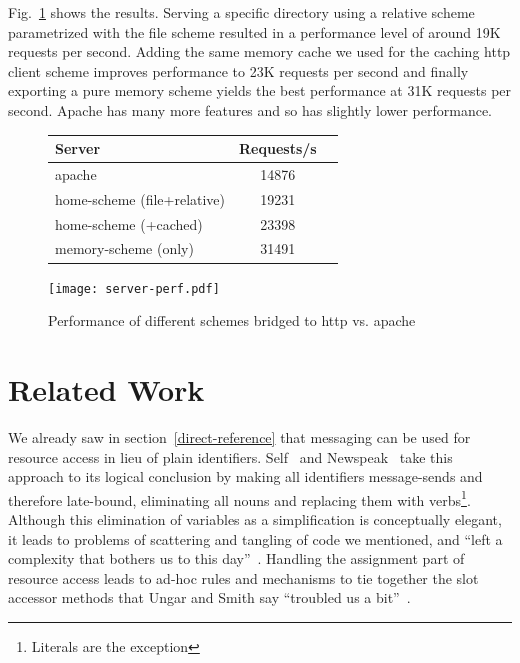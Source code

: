 \documentclass[preprint]{sigplanconf}
\begin{document}
Fig.~\ref{http-server-speed} shows the results.  Serving a specific directory using a relative scheme parametrized
with the file scheme resulted in a performance level of around 19K requests per second.  Adding the same memory cache
we used for the caching http client scheme improves performance to 23K requests per second and finally exporting a pure
memory scheme yields the best performance at 31K requests per second.   Apache has many more features and so
has slightly lower performance.

\begin{figure}
\begin{minipage}[c]{0.58\textwidth}
\begin{tabular}{|l|c|c|} \hline
Server   &  Requests/s    \\ \hline
apache & 	14876	      \\ %
home-scheme (file+relative) &  19231   \\ %
home-scheme (+cached)  &  23398  \\ %
memory-scheme (only) &  31491  \\ \hline
\end{tabular}
\end{minipage}
\begin{minipage}[c]{0.58\textwidth}
\texttt{[image: server-perf.pdf]}
\end{minipage}
\vspace{-2.0em}
\caption{Performance of different schemes bridged to http vs. apache}
\label{http-server-speed}
\end{figure}





\section{Related Work}
\label{related-work}


We already saw in section~\ref{direct-reference} that messaging can be used for resource
access in lieu of plain identifiers.  Self~\cite{UngarS87} and Newspeak~\cite{Bracha:2010:MON:1883978.1884007} take this
approach to its logical conclusion by making all identifiers message-sends and therefore late-bound, eliminating
all nouns and replacing them with verbs\footnote{Literals are the exception}.  Although
this elimination of variables as a simplification is conceptually elegant, it leads to problems of scattering and tangling of code we
mentioned, and  ``left a complexity that bothers us to this day''~\cite{Ungar:2007:SEL:1238844.1238853}.
Handling the assignment part of resource access leads to ad-hoc rules and mechanisms to tie together
the slot accessor methods that Ungar and Smith say ``troubled us a bit''~\cite{Ungar:2007:SEL:1238844.1238853}.
\end{document}
